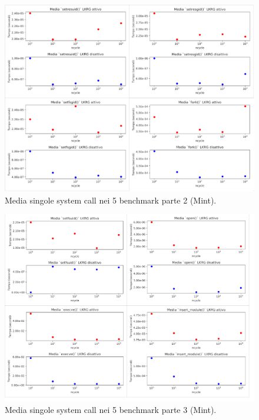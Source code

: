\begin{figure}[!htbp]
\centering
\includegraphics[scale=1.35]{Figures/Mint/Mean2}
\caption[Media singole system call nei 5 benchmark parte 2 (Mint)]{Media singole system call nei 5 benchmark parte 2 (Mint).}
\label{fig:mean2MintFig}
\end{figure}

\begin{figure}[!htbp]
\centering
\includegraphics[scale=1.35]{Figures/Mint/Mean3}
\caption[Media singole system call nei 5 benchmark parte 3 (Mint)]{Media singole system call nei 5 benchmark parte 3 (Mint).}
\label{fig:mean3MintFig}
\end{figure}

